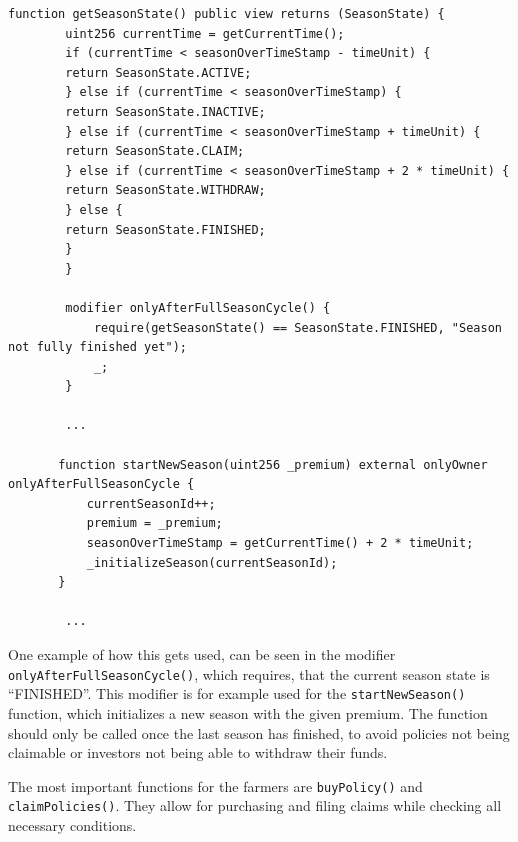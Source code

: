 \documentclass[11pt,a4paper]{article}
\begin{document}
\begin{lstlisting}[style=soliditystyle, caption={RainyDayFund.sol - Main Insurance Contract},label={lst:lstlisting1}]
        function getSeasonState() public view returns (SeasonState) {
        uint256 currentTime = getCurrentTime();
        if (currentTime < seasonOverTimeStamp - timeUnit) {
        return SeasonState.ACTIVE;
        } else if (currentTime < seasonOverTimeStamp) {
        return SeasonState.INACTIVE;
        } else if (currentTime < seasonOverTimeStamp + timeUnit) {
        return SeasonState.CLAIM;
        } else if (currentTime < seasonOverTimeStamp + 2 * timeUnit) {
        return SeasonState.WITHDRAW;
        } else {
        return SeasonState.FINISHED;
        }
        }

        modifier onlyAfterFullSeasonCycle() {
            require(getSeasonState() == SeasonState.FINISHED, "Season not fully finished yet");
            _;
        }

        ...

       function startNewSeason(uint256 _premium) external onlyOwner onlyAfterFullSeasonCycle {
           currentSeasonId++;
           premium = _premium;
           seasonOverTimeStamp = getCurrentTime() + 2 * timeUnit;
           _initializeSeason(currentSeasonId);
       }

        ...
    \end{lstlisting}

    One example of how this gets used, can be seen in the modifier \texttt{onlyAfterFullSeasonCycle()}, which requires, that the current season state is \enquote{FINISHED}.
    This modifier is for example used for the \texttt{startNewSeason()} function, which initializes a new season with the given premium.
    The function should only be called once the last season has finished, to avoid policies not being claimable or investors not being able to withdraw their funds.

    The most important functions for the farmers are \texttt{buyPolicy()} and \texttt{claimPolicies()}.
    They allow for purchasing and filing claims while checking all necessary conditions.
\end{document}

